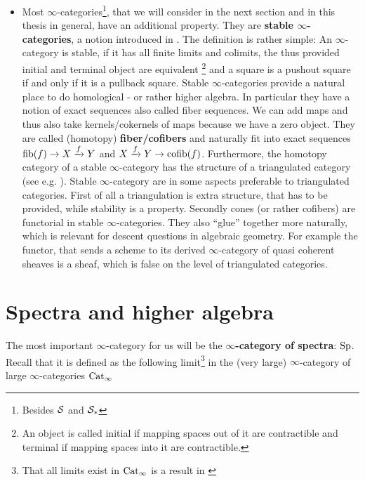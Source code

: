 \begin{itemize}
    \item Most $\infty$-categories\footnote{Besides $\mathcal{S}$ and $\mathcal{S}_*$}, that we will consider in the next section and in this thesis in general, have an additional property. They are \textbf{stable $\infty$-categories}, a notion introduced in \cite[Section~1.1]{lurie2017higher}. The definition is rather simple: An $\infty$-category is stable, if it has all finite limits and colimits, the thus provided initial and terminal object are equivalent \footnote{An object is called initial if mapping spaces out of it are contractible and terminal if mapping spaces into it are contractible.} and a square is a pushout square if and only if it is a pullback square.  Stable $\infty$-categories provide a natural place to do homological - or rather higher algebra. In particular they have a notion of exact sequences also called fiber sequences. We can add maps and thus also take kernels/cokernels of maps because we have a zero object. They are called (homotopy) \textbf{fiber/cofibers} and naturally fit into exact sequences $\operatorname{fib}(f)\rightarrow X\xrightarrow{f} Y$ and $X\xrightarrow{f} Y\rightarrow \operatorname{cofib}(f)$. Furthermore, the homotopy category of a stable $\infty$-category has the structure of a triangulated category (see e.g. \cite[Theorem~1.1.2.14]{lurie2017higher}). Stable $\infty$-category are in some aspects preferable to triangulated categories. First of all a triangulation is extra structure, that has to be provided, while stability is a property. Secondly cones (or rather cofibers) are functorial in stable $\infty$-categories. 
    They also ``glue'' together more naturally, which is relevant for descent questions in algebraic geometry. For example the functor, that sends a scheme to its derived $\infty$-category of quasi coherent sheaves is a sheaf, which is false on the level of triangulated categories.
    
\end{itemize}
\section{Spectra and higher algebra}\label{higheralg}
The most important $\infty$-category for us will be the\textbf{ $\infty$-category of spectra}: $\operatorname{Sp}$. Recall that it is defined as the following limit\footnote{That all limits exist in $\operatorname{Cat}_\infty$ is a result in \cite[Section~3.3.3]{HigherToposTheory}} in the (very large) $\infty$-category of large $\infty$-categories $\operatorname{Cat}_\infty$

